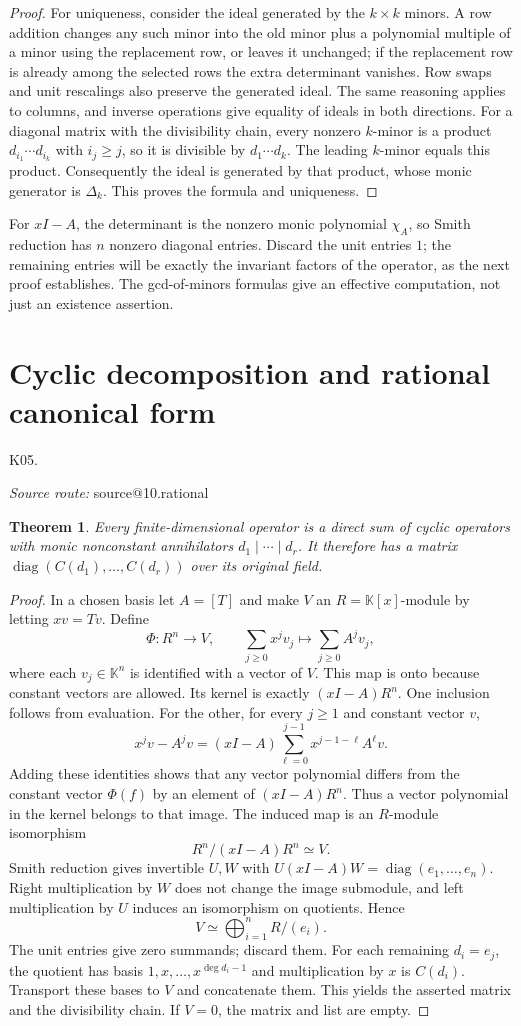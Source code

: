 \documentclass[11pt,a4paper]{book}
\makeatletter
\newtheorem{theorem}{Theorem}[chapter]
\theoremstyle{definition}\newtheorem{definition}[theorem]{Definition}
\theoremstyle{remark}\newtheorem{remark}[theorem]{Remark}
\newcommand{\K}{\mathbb K}\newcommand{\R}{\mathbb R}\newcommand{\C}{\mathbb C}
\DeclareMathOperator{\diag}{diag}\DeclareMathOperator{\id}{id}
\newcommand{\Kentry}[2]{\section{#2}\label{k:#1}\noindent\textsf{\small K05.\detokenize{#1}}\par
  \begingroup\small\color{black!65}\textit{Source route: }\csname source@#1\endcsname\par\endgroup}
\makeatother
\begin{document}
\begin{proof}
For uniqueness, consider the ideal generated by the $k\times k$ minors. A row addition changes any such minor into the old minor plus a polynomial multiple of a minor using the replacement row, or leaves it unchanged; if the replacement row is already among the selected rows the extra determinant vanishes. Row swaps and unit rescalings also preserve the generated ideal. The same reasoning applies to columns, and inverse operations give equality of ideals in both directions. For a diagonal matrix with the divisibility chain, every nonzero $k$-minor is a product $d_{i_1}\cdots d_{i_k}$ with $i_j\ge j$, so it is divisible by $d_1\cdots d_k$. The leading $k$-minor equals this product. Consequently the ideal is generated by that product, whose monic generator is $\Delta_k$. This proves the formula and uniqueness.
\end{proof}
For $xI-A$, the determinant is the nonzero monic polynomial $\chi_A$, so Smith reduction has $n$ nonzero diagonal entries. Discard the unit entries $1$; the remaining entries will be exactly the invariant factors of the operator, as the next proof establishes. The gcd-of-minors formulas give an effective computation, not just an existence assertion.

\Kentry{10.rational}{Cyclic decomposition and rational canonical form}
\begin{theorem}
Every finite-dimensional operator is a direct sum of cyclic operators with monic nonconstant annihilators $d_1\mid\cdots\mid d_r$. It therefore has a matrix $\diag(C(d_1),\ldots,C(d_r))$ over its original field.
\end{theorem}
\begin{proof}
In a chosen basis let $A=[T]$ and make $V$ an $R=\K[x]$-module by letting $xv=Tv$. Define
\[\Phi:R^n\longrightarrow V,\qquad \sum_{j\ge0}x^jv_j\longmapsto\sum_{j\ge0}A^jv_j,
\]
where each $v_j\in\K^n$ is identified with a vector of $V$. This map is onto because constant vectors are allowed. Its kernel is exactly $(xI-A)R^n$. One inclusion follows from evaluation. For the other, for every $j\ge1$ and constant vector $v$,
\[x^jv-A^jv=(xI-A)\sum_{\ell=0}^{j-1}x^{j-1-\ell}A^\ell v.\]
Adding these identities shows that any vector polynomial differs from the constant vector $\Phi(f)$ by an element of $(xI-A)R^n$. Thus a vector polynomial in the kernel belongs to that image. The induced map is an $R$-module isomorphism
\[R^n/(xI-A)R^n\simeq V.\]
Smith reduction gives invertible $U,W$ with $U(xI-A)W=\diag(e_1,\ldots,e_n)$. Right multiplication by $W$ does not change the image submodule, and left multiplication by $U$ induces an isomorphism on quotients. Hence
\[V\simeq\bigoplus_{i=1}^n R/(e_i).
\]
The unit entries give zero summands; discard them. For each remaining $d_i=e_j$, the quotient has basis $1,x,\ldots,x^{\deg d_i-1}$ and multiplication by $x$ is $C(d_i)$. Transport these bases to $V$ and concatenate them. This yields the asserted matrix and the divisibility chain. If $V=0$, the matrix and list are empty.
\end{proof}
\end{document}
